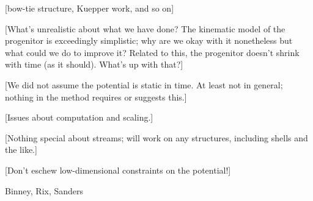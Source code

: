 \documentclass[letterpaper,12pt,preprint]{aastex}
\begin{document}
[bow-tie structure, Kuepper work, and so on]

[What's unrealistic about what we have done?  The kinematic model of
  the progenitor is exceedingly simplistic; why are we okay with it
  nonetheless but what could we do to improve it?  Related to this,
  the progenitor doesn't shrink with time (as it should).  What's up
  with that?]

[We did not assume the potential is static in time.  At least not in
  general; nothing in the method requires or suggests this.]

[Issues about computation and scaling.]

[Nothing special about streams; will work on any structures, including
  shells and the like.]

[Don't eschew low-dimensional constraints on the potential!]




\acknowledgements
Binney, Rix, Sanders
\end{document}

